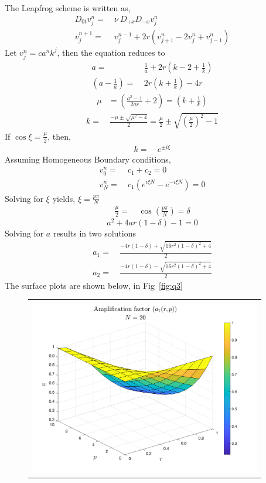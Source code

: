 \documentclass[11pt]{article}
\newcommand{\Dzt}{D_{0t}}
\newcommand{\Dpx}{D_{+x}}
\newcommand{\Dmx}{D_{-x}}
\newcommand{\vnj}{v^{n}_j}
\newcommand{\vnpj}{v^{n+1}_j}
\newcommand{\vnjp}{v^{n}_{j+1}}
\newcommand{\vnjm}{v^{n}_{j-1}}
\newcommand{\bra}[1]{\left(#1\right)}
\begin{document}
\begin{enumerate}
\begin{enumerate}
      The Leapfrog scheme is written as,
      \begin{align*}
      \Dzt\vnj = & \ \nu \ \Dpx\Dmx \vnj \\
      \vnpj  =& \  v^{n-1}_{j} + 2r\bra{\vnjp-2\vnj+\vnjm}
      \end{align*}
      Let $\vnj = ca^{n}k^{j}$, then the equation reduces to
      \begin{align*}
      a = & \ \frac{1}{a} + 2r\bra{k-2+\frac{1}{k}} \\
      \bra{a-\frac{1}{a}} = & \ 2r\bra{k + \frac{1}{k}}-4r
      \end{align*}
      \begin{align*}
      \mu &= \bra{\frac{a^2-1}{2ar}+2} = \bra{k+\frac{1}{k}}
      \end{align*}
      \begin{align*}
      k = & \ \frac{-\mu \pm \sqrt{\mu^2-4}}{2} = \frac{\mu}{2} \pm \sqrt{\bra{\frac{\mu}{2}}^2-1}
      \end{align*}
      If $\cos\xi = \frac{\mu}{2}$, then,
      \begin{align*}
      k = & \ e^{\pm i \xi}
      \end{align*}
      Assuming Homogeneous Boundary conditions,
      \begin{align*}
      v^n_{0} = & \ c_1 + c_2 = 0 \\
      v^n_{N} = & \ c_1\bra{e^{i\xi N} - e^{-i\xi N}} = 0
      \end{align*}
      Solving for $\xi$ yields, $\xi = \frac{p\pi}{N}$
      \begin{align*}
      \frac{\mu}{2} = & \ \cos\bra{\frac{p\pi}{N}} = \delta 
      \end{align*}
      \[  a^2 + 4ar\bra{1-\delta} - 1 =   0 \]
      Solving for $a$ results in two solutions
      \begin{align*}
      a_1 = & \ \frac{-4r\bra{1-\delta} + \sqrt{16r^2\bra{1-\delta}^2 + 4}}{2} \\
      a_2 = & \ \frac{-4r\bra{1-\delta} - \sqrt{16r^2\bra{1-\delta}^2 + 4}}{2}
      \end{align*}
      The surface plots are shown below, in Fig~\ref{fig:q3}
      \begin{figure}[htp]
      \centering
      \begin{tabular}{|c|}
      \hline \\
      \includegraphics[width=4in]{a1} \\

\end{tabular}
\end{figure}
\end{enumerate}
\end{enumerate}
\end{document}
